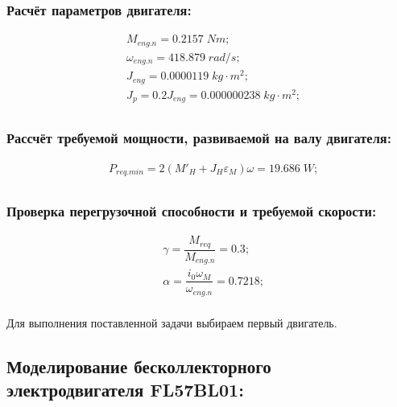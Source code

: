 \subsubsection{Расчёт параметров двигателя:}
\begin{equation}
	\begin{split}
		&M_{eng.n}=0.2157\; Nm;\\
		&\omega_{eng.n} = 418.879\; rad/s;\\
		&J_{eng} = 0.0000119\; kg\cdot m^2;\\
		&J_p=0.2J_{eng}=0.000000238\; kg\cdot m^2;\\
	\end{split}			
\end{equation}

\subsubsection{Рассчёт требуемой мощности, развиваемой на валу двигателя:}
\begin{equation}
	\begin{split}
		&P_{req.min}=2\left({M'}_H+J_H \varepsilon_M\right)\omega=19.686 \; W;\\
	\end{split}			
\end{equation}

\subsubsection{Проверка перегрузочной способности и требуемой скорости:}
\begin{equation}
	\begin{split}
		&\gamma=\dfrac{M_{req}}{M_{eng.n}}=0.3;\\
		&\alpha=\dfrac{i_0\omega_M}{\omega_{eng.n}}=0.7218 ;\\
	\end{split}			
\end{equation}

Для выполнения поставленной задачи выбираем первый двигатель.

\subsection{Моделирование бесколлекторного электродвигателя FL57BL01:}

